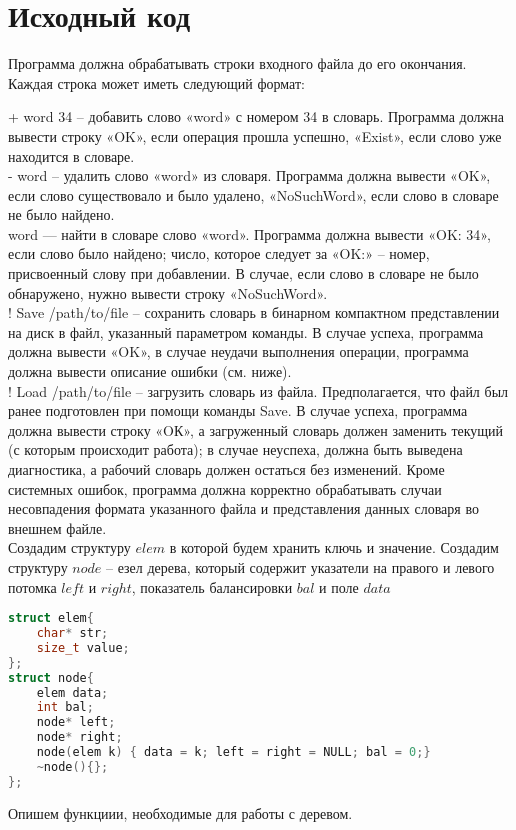 \documentclass[pdf, unicode, 12pt, a4paper,oneside,fleqn]{article}
\begin{document}
\section{Исходный код}
Программа должна обрабатывать строки входного файла до его окончания. Каждая строка может иметь следующий формат:

+ word 34 -- добавить слово «word» с номером 34 в словарь. Программа должна вывести строку «OK», если операция прошла успешно, «Exist», если слово уже находится в словаре.\\
- word -- удалить слово «word» из словаря. Программа должна вывести «OK», если слово существовало и было удалено, «NoSuchWord», если слово в словаре не было найдено.\\
word — найти в словаре слово «word». Программа должна вывести «OK: 34», если слово было найдено; число, которое следует за «OK:» -- номер, присвоенный слову при добавлении. В случае, если слово в словаре не было обнаружено, нужно вывести строку «NoSuchWord».\\
! Save /path/to/file -- сохранить словарь в бинарном компактном представлении на диск в файл, указанный параметром команды. В случае успеха, программа должна вывести «OK», в случае неудачи выполнения операции, программа должна вывести описание ошибки (см. ниже).\\
! Load /path/to/file -- загрузить словарь из файла. Предполагается, что файл был ранее подготовлен при помощи команды Save. В случае успеха, программа должна вывести строку «OК», а загруженный словарь должен заменить текущий (с которым происходит работа); в случае неуспеха, должна быть выведена диагностика, а рабочий словарь должен остаться без изменений. Кроме системных ошибок, программа должна корректно обрабатывать случаи несовпадения формата указанного файла и представления данных словаря во внешнем файле.\\
Создадим структуру $elem$ в которой будем хранить ключь и значение. Создадим структуру $node$ -- езел дерева, который содержит указатели на правого и левого потомка $left$ и $right$, показатель балансировки $bal$ и поле $data$ 
\begin{lstlisting}[language=C++]
struct elem{
    char* str;
    size_t value;
};
struct node{
    elem data;
    int bal;
    node* left;
    node* right;
    node(elem k) { data = k; left = right = NULL; bal = 0;}
    ~node(){};  
};	
\end{lstlisting}
Опишем функциии, необходимые для работы с деревом.
\end{document}

